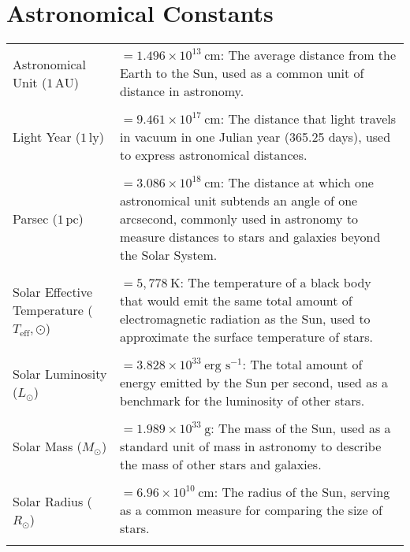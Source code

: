 \documentclass[main.tex]{subfiles}
\begin{document}
\section*{Astronomical Constants}
\begin{longtable}{p{} p{}}
    Astronomical Unit ($1\,\text{AU}$) & $= 1.496 \times 10^{13}\ \text{cm}$: The average distance from the Earth to the Sun, used as a common unit of distance in astronomy. \\\\
    Light Year ($1\,\text{ly}$) & $= 9.461 \times 10^{17}\ \text{cm}$: The distance that light travels in vacuum in one Julian year (365.25 days), used to express astronomical distances. \\\\
    Parsec ($1\,\text{pc}$) & $= 3.086 \times 10^{18}\ \text{cm}$: The distance at which one astronomical unit subtends an angle of one arcsecond, commonly used in astronomy to measure distances to stars and galaxies beyond the Solar System. \\\\
    Solar Effective Temperature ($T_\mathrm{eff},\odot$) & $= 5,778\ \text{K}$: The temperature of a black body that would emit the same total amount of electromagnetic radiation as the Sun, used to approximate the surface temperature of stars. \\\\
    Solar Luminosity ($L_{\odot}$) & $= 3.828 \times 10^{33}\ \text{erg s}^{-1}$: The total amount of energy emitted by the Sun per second, used as a benchmark for the luminosity of other stars. \\\\
    Solar Mass ($M_{\odot}$) & $= 1.989 \times 10^{33}\ \text{g}$: The mass of the Sun, used as a standard unit of mass in astronomy to describe the mass of other stars and galaxies. \\\\
    Solar Radius ($R_{\odot}$) & $= 6.96 \times 10^{10}\ \text{cm}$: The radius of the Sun, serving as a common measure for comparing the size of stars. \\\\
\end{longtable}
\end{document}
